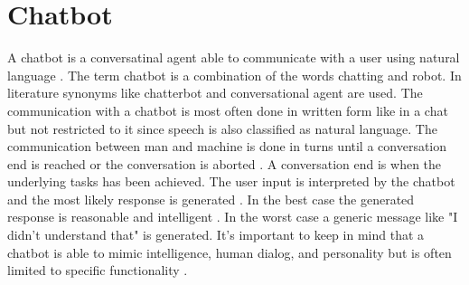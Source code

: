 \section{Chatbot} \label{sec:chatbot}
A chatbot is a conversatinal agent able to communicate with a user using natural language 
\cite{evaluateChatbotsShawar2007, shawar2007chatbots, huang2007extracting, gregori2017evaluation}.
The term chatbot is a combination of the words chatting and robot.
In literature synonyms like chatterbot and conversational agent are used.
The communication with a chatbot is most often done in written form like in a chat but not restricted to it since 
speech is also classified as natural language.
The communication between man and machine is done in turns until a conversation end is reached 
or the conversation is aborted \cite{vrajitoru2004evolutionary}.
A conversation end is when the underlying tasks has been achieved.
The user input is interpreted by the chatbot and the most likely response is generated \cite{dutta2017developing}.
In the best case the generated response is reasonable and intelligent \cite{vrajitoru2004evolutionary}. 
In the worst case a generic message like "I didn't understand that" is generated.
It's important to keep in mind that a chatbot is able to mimic intelligence, human dialog, 
and personality but is often limited to specific functionality \cite{kane2016role, dutta2017developing}.

